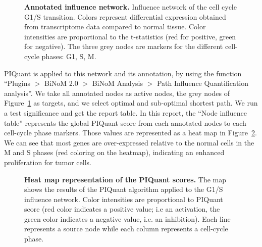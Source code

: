\documentclass[10pt]{bmc_article}
\newenvironment{bmcformat}{\baselineskip20pt\sloppy\setboolean{publ}{false}}{\baselineskip20pt\sloppy}
\begin{document}
\begin{bmcformat}
\begin{figure}[h]
  \caption{\label{InflAnnotNet} \textbf{Annotated influence network.}
    Influence network of the cell cycle G1/S transition. Colors represent differential
expression obtained from transcriptome data compared to normal tissue. Color 
intensities are proportional to the t-statistics (red for positive, green for
negative). The three grey nodes are markers for the different cell-cycle phases: G1, S, M.}
\end{figure}

PIQuant is applied to this network and its annotation, by using the function
``Plugins $>$ BiNoM 2.0 $>$ BiNoM Analysis $>$ Path Influence Quantification
analysis''. We take all annotated nodes as active nodes, the grey nodes of
Figure~\ref{InflAnnotNet} as targets, and we select optimal and sub-optimal 
shortest path. We run a test significance and get the report table. In this
report, the ``Node influence table'' represents the global PIQuant score from
each annotated nodes to each cell-cycle phase markers. Those values are
represented as a heat map in Figure~\ref{PIQuantHeatMap}. We can see that most
genes are over-expressed relative to the normal cells in the M and S phases (red
coloring on the heatmap), indicating an enhanced proliferation for tumor cells.

\begin{figure}[h]
  \caption{\label{PIQuantHeatMap} \textbf{Heat map representation of the PIQuant
scores.}
    The map shows the results of the PIQuant algorithm applied to the G1/S
influence network. Color intensities are proportional to PIQuant score (red color indicates a positive
value; i.e an activation, the green color indicates a negative value, i.e. an
inhibition).
Each line represents a source node while each column represents a cell-cycle
phase.}
 

\end{figure}
\end{bmcformat}
\end{document}
